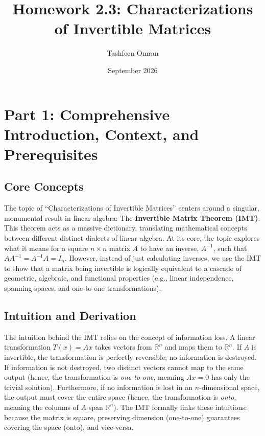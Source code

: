 \documentclass[11pt]{article}
\title{Homework 2.3: Characterizations of Invertible Matrices}
\author{Tashfeen Omran}
\date{September 2026}
\begin{document}
\maketitle

\section*{Part 1: Comprehensive Introduction, Context, and Prerequisites}

\subsection*{Core Concepts}
The topic of ``Characterizations of Invertible Matrices'' centers around a singular, monumental result in linear algebra: The \textbf{Invertible Matrix Theorem (IMT)}. This theorem acts as a massive dictionary, translating mathematical concepts between different distinct dialects of linear algebra. At its core, the topic explores what it means for a square $n \times n$ matrix $A$ to have an inverse, $A^{-1}$, such that $A A^{-1} = A^{-1} A = I_n$. However, instead of just calculating inverses, we use the IMT to show that a matrix being invertible is logically equivalent to a cascade of geometric, algebraic, and functional properties (e.g., linear independence, spanning spaces, and one-to-one transformations). 

\subsection*{Intuition and Derivation}
The intuition behind the IMT relies on the concept of information loss. A linear transformation $T(x) = Ax$ takes vectors from $\mathbb{R}^n$ and maps them to $\mathbb{R}^n$. If $A$ is invertible, the transformation is perfectly reversible; no information is destroyed. 
If information is not destroyed, two distinct vectors cannot map to the same output (hence, the transformation is \textit{one-to-one}, meaning $Ax=0$ has only the trivial solution). Furthermore, if no information is lost in an $n$-dimensional space, the output must cover the entire space (hence, the transformation is \textit{onto}, meaning the columns of $A$ span $\mathbb{R}^n$). 
The IMT formally links these intuitions: because the matrix is square, preserving dimension (one-to-one) guarantees covering the space (onto), and vice-versa. 
\end{document}

